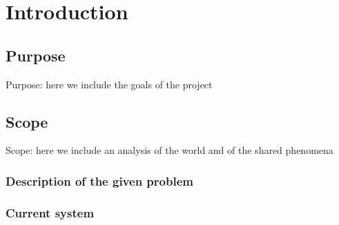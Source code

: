 \section{Introduction}
\label{sect:introduction}
\subsection{Purpose}
Purpose: here we include the goals of the project
\subsection{Scope}
Scope: here we include an analysis of the world and of the shared phenomena
\subsubsection{Description of the given problem}
\subsubsection{Current system}
